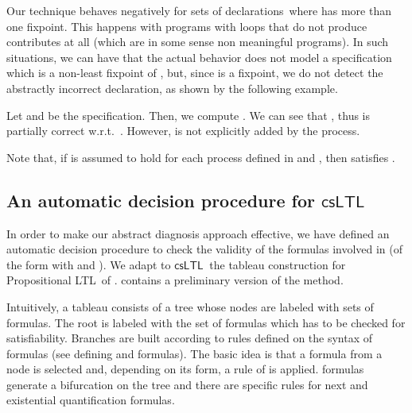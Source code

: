\documentclass[american]{new_tlp}
\newcommand*{\csltl}[1][]{\ensuremath{\textsf{csLTL}_{#1}}}
\newcommand*{\ltl}{\textsf{LTL}}
\newcommand*{\programs}{sets of declarations}
\providecommand*{\wrt}  {w.r.t.}
\begin{document}
Our technique behaves negatively for \programs\  where  has
more than one fixpoint.  This happens with programs with loops that do not
produce contributes at all (which are in some sense non meaningful
programs).  In such situations, we can have that the actual behavior does
not model a specification  which is a non-least fixpoint of
, but, since  is a fixpoint, we do not detect the
abstractly incorrect declaration, as shown by the following example.
\begin{example}\label{ex:event_loop}
    Let  and  be the specification.  Then,
    we compute .  We can see that
    , thus  is
    partially correct \wrt\ .  However,  is not explicitly
    added by the process.
\end{example} 

Note that, if  is assumed to hold for
each process  defined in  and , then  satisfies .


\subsection{An automatic decision procedure for \csltl}\label{sec:decision}

In order to make our abstract diagnosis approach effective, we have defined
an automatic decision procedure to check the validity of the formulas
involved in  (of the form 
with  and ).  We adapt to \csltl\ the tableau construction for
Propositional \ltl\ of \cite{GaintzarainHLN08,GaintzarainHLNO09}.
\cite{CominiTV13-WLPE} contains a preliminary version of the method.


Intuitively, a tableau consists of a tree whose nodes are labeled
with sets of formulas.  The root is labeled with the set of formulas which
has to be checked for satisfiability.  Branches are built according to
rules defined on the syntax of formulas (see 
defining  and  formulas). The basic idea is that a
formula from a node is selected and, depending on its form, a rule of
 is applied.  formulas generate a
bifurcation on the tree and there are specific rules for next and
existential quantification formulas.
\end{document}
